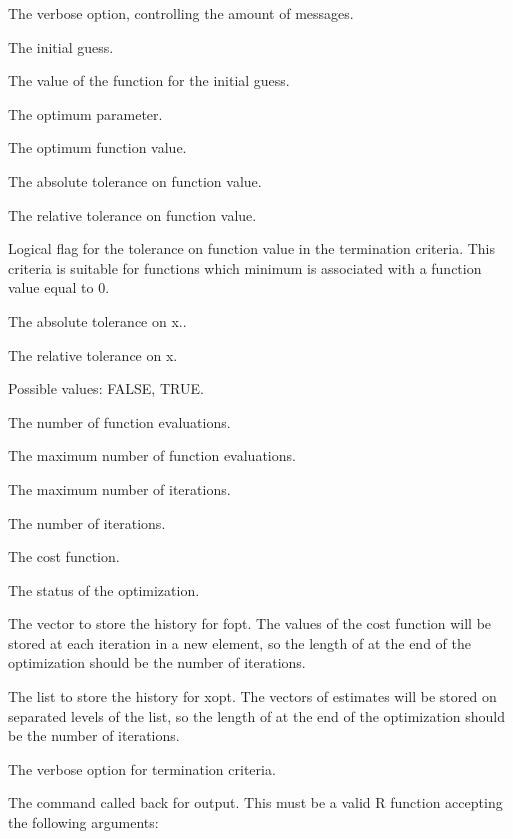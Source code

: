 %
\begin{Arguments}
\begin{ldescription}
\item[\code{verbose}] The verbose option, controlling the amount of messages.
\item[\code{x0}] The initial guess.
\item[\code{fx0}] The value of the function for the initial guess.
\item[\code{xopt}] The optimum parameter.
\item[\code{fopt}] The optimum function value.
\item[\code{tolfunabsolute}] The absolute tolerance on function value.
\item[\code{tolfunrelative}] The relative tolerance on function value.
\item[\code{tolfunmethod}] Logical flag for the tolerance on function value in
the termination criteria. This criteria is suitable for functions which
minimum is associated with a function value equal to 0.
\item[\code{tolxabsolute}] The absolute tolerance on x..
\item[\code{tolxrelative}] The relative tolerance on x.
\item[\code{tolxmethod}] Possible values: FALSE, TRUE.
\item[\code{funevals}] The number of function evaluations.
\item[\code{maxfunevals}] The maximum number of function evaluations.
\item[\code{maxiter}] The maximum number of iterations.
\item[\code{iterations}] The number of iterations.
\item[\code{fun}] The cost function.
\item[\code{status}] The status of the optimization.
\item[\code{historyfopt}] The vector to store the history for fopt. The values of
the cost function will be stored at each iteration in a new element, so
the length of  at the end of the optimization should be
the number of iterations.
\item[\code{historyxopt}] The list to store the history for xopt. The vectors of
estimates will be stored on separated levels of the list, so the length of
 at the end of the optimization should be the number of
iterations.
\item[\code{verbosetermination}] The verbose option for termination criteria.
\item[\code{outputcommand}] The command called back for output. This must be a 
valid R function accepting the following arguments: \begin{description}


\end{description}
\end{ldescription}
\end{Arguments}
